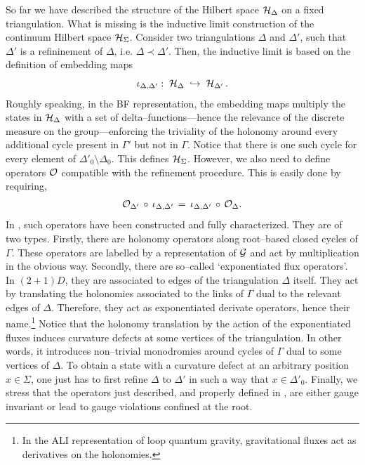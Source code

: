 \documentclass[nofootinbib,superscriptaddress,eqsecnum,tightenlines,11pt]{revtex4-1}
\def\be{\begin{equation}}
\def\ee{\end{equation}}
\def\ba{\begin{eqnarray}}
\def\ea{\end{eqnarray}}
\begin{document}
So far we have described the structure of the Hilbert space ${\cal H}_\Delta$ on a fixed triangulation.
What is missing is the inductive limit construction of the continuum Hilbert space ${\cal H}_\Sigma$.
Consider two triangulations $\Delta$ and $\Delta'$, such that $\Delta'$ is a refininement of $\Delta$, i.e. $\Delta \prec \Delta'$.
Then, the inductive limit is based on the definition of embedding maps
\be
\iota_{\Delta,\Delta'}:\; \mathcal{H}_\Delta\; \hookrightarrow \;{\cal H}_{\Delta'}\,.
\ee
Roughly speaking, in the BF representation, the embedding maps multiply the states in ${\cal H}_\Delta$ with a set of delta--functions---hence the relevance of the discrete  measure on the group---enforcing the triviality of the holonomy around every additional cycle present in $\Gamma'$ but not in $\Gamma$.
Notice that there is one such cycle for every element of $\Delta'_0\setminus\Delta_0$.
This defines ${\cal H}_\Sigma$. 
However, we also need to define operators ${\cal O}$ compatible with the refinement procedure.
This is easily done by requiring,
\ba
{\cal O}_{\Delta'} \,\circ\, \iota_{\Delta, \Delta'} \,=\, \iota_{\Delta, \Delta'}  \, \circ\, {\cal O}_{\Delta}   .
\ea
In \cite{DG14b,BDG15}, such operators have been constructed and fully characterized.
They are of two types.
Firstly, there are holonomy operators along root--based closed cycles of $\Gamma$. 
These operators are labelled by a representation of $\cal G$ and act by multiplication in the obvious way.
Secondly, there are so--called `exponentiated flux operators'.
In $(2+1)D$, they are associated to edges of the triangulation $\Delta$ itself.
They act by translating the holonomies associated to the links of $\Gamma$ dual to the relevant edges of $\Delta$.
Therefore, they act as exponentiated derivate operators, hence their name.\footnote{In the ALI representation of loop quantum gravity, gravitational fluxes act as derivatives on the holonomies.}
Notice that the holonomy translation by the action of the exponentiated fluxes induces curvature defects at some vertices of the triangulation.
In other words, it introduces non--trivial monodromies around cycles of $\Gamma$ dual to some vertices of $\Delta$.
To obtain a state with a curvature defect at an arbitrary position $x\in\Sigma$, one just has to first refine $\Delta$ to $\Delta'$ in such a way that $x\in \Delta'_0$.
Finally, we stress that the operators just described, and properly defined in \cite{DG14b,BDG15}, are either gauge invariant or lead to gauge violations confined at the root.
\end{document}
